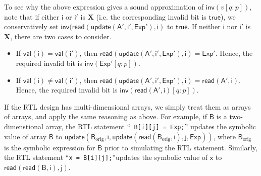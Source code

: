 \documentclass{llncs}
\newcommand{\val}{\ensuremath{\mathsf{val}}}
\newcommand{\inv}{\ensuremath{\mathsf{inv}}}
\newcommand{\true}{\ensuremath{\mathsf{true}}}
\newcommand{\arread}{\ensuremath{\mathsf{read}}}
\newcommand{\arupdate}{\ensuremath{\mathsf{update}}}
\begin{document}
To see why the above expression gives a sound approximation of
${\inv}(v[q:p])$, note that if either $\mathsf{i}$ or $\mathsf{i}'$ is
$\mathbf{X}$ (i.e. the corresponding invalid bit is ${\true}$), we
conservatively set ${\inv}({\arread}({\arupdate}(\mathsf{A}',
\mathsf{i}', \mathsf{Exp}'), \mathsf{i})$ to $\true$.  If neither
$\mathsf{i}$ nor $\mathsf{i}'$ is $\mathbf{X}$, there are two cases to
consider.
\begin{itemize}
\item If ${\val}(\mathsf{i}) = {\val}(\mathsf{i}')$, then
  ${\arread}({\arupdate}(\mathsf{A}', \mathsf{i}', \mathsf{Exp}'),
  \mathsf{i}) = \mathsf{Exp}'$.  Hence, the required invalid bit is
  ${\inv}(\mathsf{Exp}'[q:p])$.
\item If ${\val(\mathsf{i})} \ne {\val}(\mathsf{i}')$, then
  ${\arread}({\arupdate}(\mathsf{A}', \mathsf{i}', \mathsf{Exp}'),
  \mathsf{i}) = {\arread}(\mathsf{A}', \mathsf{i})$. Hence, the
  required invalid bit is ${\inv}({\arread}(\mathsf{A}',
  \mathsf{i})[q:p])$.
\end{itemize}
If the RTL design has multi-dimensional arrays, we simply treat them as arrays of
arrays, and apply the same reasoning as above.  For example, if
$\mathsf{B}$ is a two-dimenstional array, the RTL statement ``{\tt
  B[i][j] = Exp;}'' updates the symbolic value of array $\mathsf{B}$
to ${\arupdate}(\mathsf{B}_{\text{orig}}, \mathsf{i},
{\arupdate}({\arread}(\mathsf{B}_{\text{orig}}, \mathsf{i}),
\mathsf{j}, \mathsf{Exp}))$, where $\mathsf{B}_{\text{orig}}$ is the
symbolic expression for $\mathsf{B}$ prior to simulating the RTL statement.
Similarly, the RTL statement ``{\tt x = B[i][j];}''updates the
symbolic value of $\mathsf{x}$ to ${\arread}({\arread}(\mathsf{B}, \mathsf{i}), \mathsf{j})$.
\end{document}
